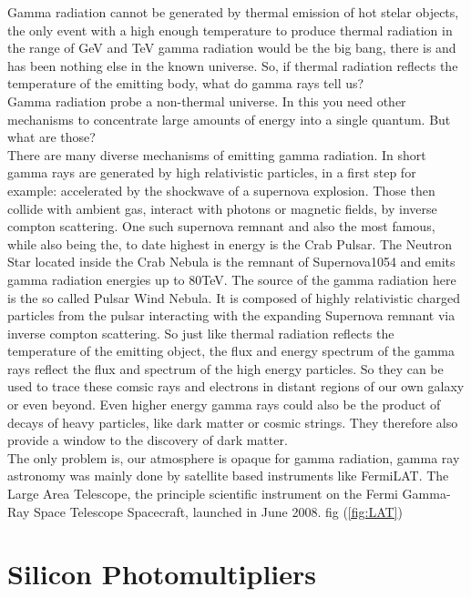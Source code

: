 \documentclass[12pt,article,type=msc,colorback,accentcolor=tud9c]{tudthesis}
\begin{document}
Gamma radiation cannot be generated by thermal emission of hot stelar objects, the only event  with a high enough temperature to produce thermal radiation in the range of GeV and TeV gamma radiation would be the big bang, there is and has been nothing else in the known universe. So, if thermal radiation reflects the temperature of the emitting body, what do gamma rays tell us?\\
Gamma radiation probe a non-thermal universe. In this you need other mechanisms to concentrate large amounts of energy into a single quantum. But what are those?\\
There are many diverse mechanisms of emitting gamma radiation. In short gamma rays are generated by high relativistic particles, in a first step for example: accelerated by the shockwave of a supernova explosion. Those then collide with ambient gas, interact with photons or magnetic fields, by inverse compton scattering.
One such supernova remnant and also the most famous, while also being the, to date highest in energy is the Crab Pulsar. The Neutron Star located inside the Crab Nebula is the remnant of Supernova1054 and emits gamma radiation energies up to 80TeV. The source of the gamma radiation here is the so called Pulsar Wind Nebula. It is composed of highly relativistic charged particles from the pulsar interacting with the expanding Supernova remnant via inverse compton scattering.
So just like thermal radiation reflects the temperature of the emitting object, the flux and energy spectrum of the gamma rays reflect the flux and spectrum of the high energy particles. So they can be used to trace these comsic rays and electrons in distant regions of our own galaxy or even beyond.
Even higher energy gamma rays could also be the product of decays of heavy particles, like dark matter or cosmic strings.  They therefore also provide a window to the discovery of dark matter.\\
The only problem is, our atmosphere is opaque for gamma radiation, gamma ray astronomy was mainly done by satellite based instruments like FermiLAT. The Large Area Telescope, the principle scientific instrument on the Fermi Gamma-Ray Space Telescope Spacecraft, launched in June 2008. fig (\ref{fig:LAT})


\clearpage
\section{\Large Silicon Photomultipliers}
\label{sec:SiPM}
\end{document}
